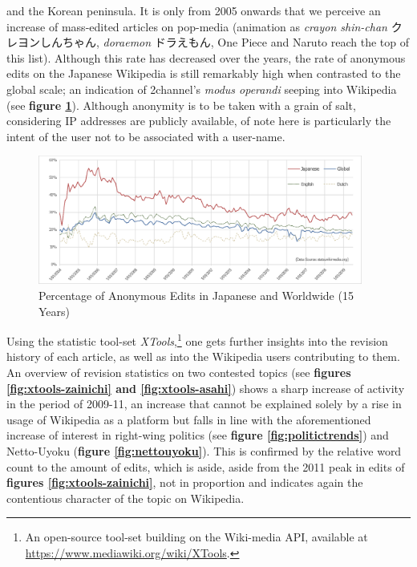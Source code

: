 \documentclass[10pt,british,A4paper,twoside]{memoir}
\begin{document}
and the Korean peninsula. It is only from 2005 onwards that we perceive
an increase of mass-edited articles on pop-media (animation as
\emph{crayon shin-chan} クレヨンしんちゃん, \emph{doraemon} ドラえもん,
One Piece and Naruto reach the top of this list). Although this rate has
decreased over the years, the rate of anonymous edits on the Japanese
Wikipedia is still remarkably high when contrasted to the global scale;
an indication of 2channel's \emph{modus operandi} seeping into Wikipedia
(see \textbf{figure \ref{fig:anon-wiki}}). Although anonymity is to be
taken with a grain of salt, considering IP addresses are publicly
available, of note here is particularly the intent of the user not to be
associated with a user-name.

\begin{figure}[!htb]
 \centering
 \includegraphics[width=0.95\textwidth,trim=4 4 4 4,clip]{images/anon-wiki.eps}
 \centering\caption{Percentage of Anonymous Edits in Japanese and Worldwide (15 Years)}\label{fig:anon-wiki}
\end{figure}

Using the statistic tool-set \emph{XTools},\footnote{An open-source
  tool-set building on the Wiki-media API, available at
  \url{https://www.mediawiki.org/wiki/XTools}.} one gets further
insights into the revision history of each article, as well as into the
Wikipedia users contributing to them. An overview of revision statistics
on two contested topics (see \textbf{figures \ref{fig:xtools-zainichi}
and \ref{fig:xtools-asahi}}) shows a sharp increase of activity in the
period of 2009-11, an increase that cannot be explained solely by a rise
in usage of Wikipedia as a platform but falls in line with the
aforementioned increase of interest in right-wing politics (see
\textbf{figure \ref{fig:politictrends}}) and Netto-Uyoku (\textbf{figure
\ref{fig:nettouyoku}}). This is confirmed by the relative word count to
the amount of edits, which is aside, aside from the 2011 peak in edits
of \textbf{figures \ref{fig:xtools-zainichi}}, not in proportion and
indicates again the contentious character of the topic on Wikipedia.
\end{document}
